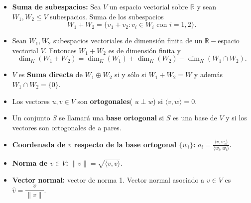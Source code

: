 \documentclass[a4paper]{article}
\theoremstyle{exampstyle}
\newtheorem{thm}{Teorema}[chapter]
\theoremstyle{definition}
\begin{document}



\begin{itemize}
 


    \item\textbf{Suma de subespacios:} Sea $V$ un espacio vectorial sobre $\mathbb{R}$ y sean $W_1, W_2 \leq V$ subespacios. Suma de los subespacios 
\[W_1+W_2=\{v_1+v_2 \colon v_i\in W_i \text{ con } i=1,2\}.\]


    \item
Sean $W_1, W_2$ subespacios vectoriales de dimensi\'on finita de un
$\mathbb{R}-$espacio vectorial $V $. Entonces $W_1 + W_2$ es de dimensi\'on finita y
\[\dim_K(W_1+ W_2)=\dim_K(W_1)+\dim_K(W_2)-\dim_K(W_1\cap W_2).\]


    \item $V$ es \textbf{Suma directa} de $W_1 \oplus W_2$ si y sólo si $ W_1 + W_2= W$ y además $W_1 \cap W_2 = \{ 0\}$.










    \item Los vectores $u,v\in V$ son \textbf{ortogonales}( $u\perp w$) si $\langle v, w \rangle=0$.

    \item Un conjunto $S$ se llamará una \textbf{base ortogonal} si $S$ es una base de $V$ y si los vectores son ortogonales de a pares.

    \item \textbf{Coordenada de $v$ respecto de la base ortogonal $\{w_i\}$:} $a_i=\frac{\langle v, w_i \rangle}{\langle w_i, w_i \rangle}$.

    \item \textbf{Norma de $v\in V$: } $\|v\| = \sqrt{\langle v, v\rangle}.$

    \item \textbf{Vector normal: } vector de norma 1. Vector normal asociado a $v\in V$ es $\hat{v}=\dfrac{v}{\|v\|}.$




\end{itemize}
\end{document}
